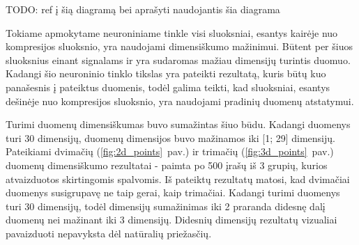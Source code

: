 \documentclass{VUMIFPSbakalaurinis}
\newcommand{\TODO}[1]{
\colorbox{todo-background-color}{TODO: #1}
}
\begin{document}
\TODO{ref į šią diagramą bei aprašyti naudojantis šia diagrama}

Tokiame apmokytame neuroniniame tinkle visi sluoksniai, esantys kairėje nuo kompresijos sluoksnio, yra naudojami dimensiškumo mažinimui.
Būtent per šiuos sluoksnius einant signalams ir yra sudaromas mažiau dimensijų turintis duomuo.
Kadangi šio neuroninio tinklo tikslas yra pateikti rezultatą, kuris būtų kuo panašesnis į pateiktus duomenis, todėl galima teikti, kad sluoksniai, esantys dešinėje nuo kompresijos sluoksnio, yra naudojami pradinių duomenų atstatymui.

Turimi duomenų dimensiškumas buvo sumažintas šiuo būdu.
Kadangi duomenys turi 30 dimensijų, duomenų dimensijos buvo mažinamos iki [1; 29] dimensijų.
Pateikiami dvimačių (\ref{fig:2d_points}~pav.) ir trimačių (\ref{fig:3d_points}~pav.) duomenų dimensiškumo rezultatai - paimta po 500 įrašų iš 3 grupių, kurios atvaizduotos skirtingomis spalvomis.
Iš pateiktų rezultatų matosi, kad dvimačiai duomenys susigrupavę ne taip gerai, kaip trimačiai.
Kadangi turimi duomenys turi 30 dimensijų, todėl dimensijų sumažinimas iki 2 praranda didesnę dalį duomenų nei mažinant iki 3 dimensijų.
Didesnių dimensijų rezultatų vizualiai pavaizduoti nepavyksta dėl natūralių priežasčių.
\end{document}
